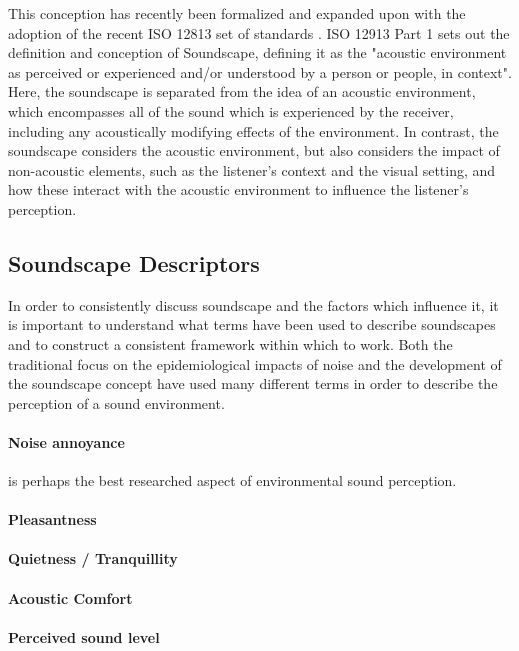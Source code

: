 This conception has recently been formalized and expanded upon with the adoption of the recent ISO 12813 set of standards \citep{ISO12913_1_2014IOS,ISO12913_2_2018IOS,ISO12913_3_2019IOS}. ISO 12913 Part 1 sets out the definition and conception of Soundscape, defining it as the "acoustic environment as perceived or experienced and/or understood by a person or people, in context". Here, the soundscape is separated from the idea of an acoustic environment, which encompasses all of the sound which is experienced by the receiver, including any acoustically modifying effects of the environment. In contrast, the soundscape considers the acoustic environment, but also considers the impact of non-acoustic elements, such as the listener's context and the visual setting, and how these interact with the acoustic environment to influence the listener's perception.

\subsection{Soundscape Descriptors}
In order to consistently discuss soundscape and the factors which influence it, it is important to understand what terms have been used to describe soundscapes and to construct a consistent framework within which to work. Both the traditional focus on the epidemiological impacts of noise and the development of the soundscape concept have used many different terms in order to describe the perception of a sound environment.

\paragraph{Noise annoyance} is perhaps the best researched aspect of environmental sound perception.

\paragraph{Pleasantness}

\paragraph{Quietness / Tranquillity}

\paragraph{Acoustic Comfort}

\paragraph{Perceived sound level}

